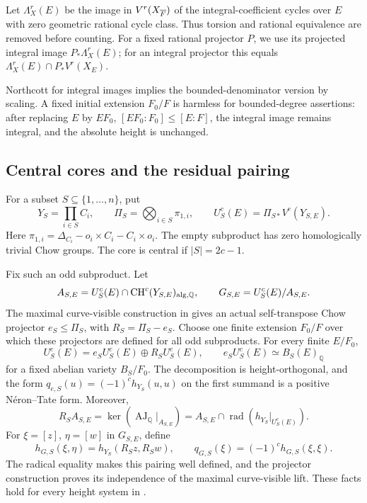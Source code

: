 \documentclass[11pt,a4paper]{article}
\theoremstyle{definition}
\newtheorem{definition}[theorem]{Definition}
\newcommand{\Q}{\mathbb Q}\newcommand{\R}{\mathbb R}\newcommand{\C}{\mathbb C}
\newcommand{\CH}{\operatorname{CH}}\newcommand{\Pic}{\operatorname{Pic}}
\newcommand{\rad}{\operatorname{rad}}\newcommand{\rk}{\operatorname{rank}}
\newcommand{\AJ}{\operatorname{AJ}}\newcommand{\Tr}{\operatorname{Tr}}
\numberwithin{equation}{section}
\begin{document}
Let \(\Lambda_X^r(E)\) be the image in \(V^r(X_{\overline F})\) of the
integral-coefficient cycles over \(E\) with zero geometric rational
cycle class. Thus torsion and rational equivalence are removed before
counting. For a fixed rational projector \(P\), we use its projected
integral image \(P_*\Lambda_X^r(E)\); for an integral projector this
equals \(\Lambda_X^r(E)\cap P_*V^r(X_E)\).


Northcott for integral images implies the bounded-denominator version
by scaling. A fixed initial extension \(F_0/F\) is harmless for
bounded-degree assertions: after replacing \(E\) by \(EF_0\),
\([EF_0:F_0]\le[E:F]\), the integral image remains integral, and
the absolute height is unchanged.





\subsection{Central cores and the residual pairing}
\label{sec:central-data}

For a subset \(S\subseteq\{1,\ldots,n\}\), put
\[
 Y_S=\prod_{i\in S}C_i,\qquad
 \Pi_S=\bigotimes_{i\in S}\pi_{1,i},
 \qquad U_S^c(E)=\Pi_{S*}V^c(Y_{S,E}).
\]
Here \(\pi_{1,i}=\Delta_{C_i}-o_i\times C_i-C_i\times o_i\).
The empty subproduct has zero homologically trivial Chow groups.
The core is central if \(|S|=2c-1\).

Fix such an odd subproduct. Let
\[
 A_{S,E}=U_S^c(E)\cap\CH^c(Y_{S,E})_{\alg,\Q},
 \qquad G_{S,E}=U_S^c(E)/A_{S,E}.
\]
The maximal curve-visible construction in
\cite[Section 3]{ArithmeticReductions} gives an actual
self-transpose Chow projector \(e_S\le\Pi_S\), with
\(R_S=\Pi_S-e_S\). Choose one finite extension \(F_0/F\)
over which these projectors are defined for all odd subproducts.
For every finite \(E/F_0\),
\[
 U_S^c(E)=e_SU_S^c(E)\oplus R_SU_S^c(E),\qquad
 e_SU_S^c(E)\simeq B_S(E)_\Q
\]
for a fixed abelian variety \(B_S/F_0\).
The decomposition is height-orthogonal, and the form
\(q_{e,S}(u)=(-1)^ch_{Y_S}(u,u)\) on the first summand is
a positive Néron--Tate form. Moreover,
\[
 R_SA_{S,E}=\ker(\AJ_\Q|_{A_{S,E}})
 =A_{S,E}\cap\rad(h_{Y_S}|_{U_S^c(E)}).
\]
For \(\xi=[z]\), \(\eta=[w]\) in \(G_{S,E}\), define
\[
 h_{G,S}(\xi,\eta)=h_{Y_S}(R_Sz,R_Sw),\qquad
 q_{G,S}(\xi)=(-1)^ch_{G,S}(\xi,\xi).
\]
The radical equality makes this pairing well defined, and the
projector construction proves its independence of the maximal
curve-visible lift. These facts hold for every height system in
.
\end{document}
